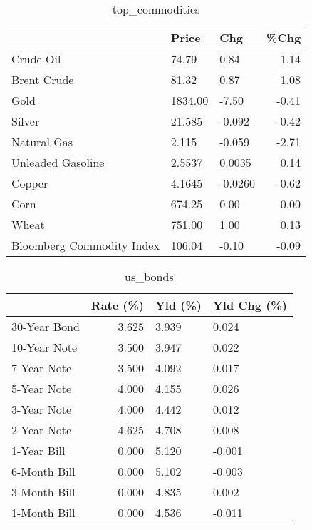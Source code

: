 \documentclass{article}%
\begin{document}
\begin{table}[htbp]%
\caption{top\_commodities}%
\centering%
\begin{adjustbox}{width=1\textwidth}%
\begin{tabular}{lllr}
\toprule
                          &   Price &     Chg &  \%Chg \\
\midrule
               Crude Oil  &   74.79 &    0.84 &  1.14 \\
             Brent Crude  &   81.32 &    0.87 &  1.08 \\
                    Gold  & 1834.00 &   -7.50 & -0.41 \\
                  Silver  &  21.585 &  -0.092 & -0.42 \\
             Natural Gas  &   2.115 &  -0.059 & -2.71 \\
       Unleaded Gasoline  &  2.5537 &  0.0035 &  0.14 \\
                  Copper  &  4.1645 & -0.0260 & -0.62 \\
                    Corn  &  674.25 &    0.00 &  0.00 \\
                   Wheat  &  751.00 &    1.00 &  0.13 \\
Bloomberg Commodity Index &  106.04 &   -0.10 & -0.09 \\
\bottomrule
\end{tabular}
%
\end{adjustbox}%
\end{table}

%


\begin{table}[htbp]%
\caption{us\_bonds}%
\centering%
\begin{adjustbox}{width=1\textwidth}%
\begin{tabular}{lrll}
\toprule
             &  Rate (\%) & Yld (\%) & Yld Chg (\%) \\
\midrule
30-Year Bond &     3.625 &   3.939 &       0.024 \\
10-Year Note &     3.500 &   3.947 &       0.022 \\
 7-Year Note &     3.500 &   4.092 &       0.017 \\
 5-Year Note &     4.000 &   4.155 &       0.026 \\
 3-Year Note &     4.000 &   4.442 &       0.012 \\
 2-Year Note &     4.625 &   4.708 &       0.008 \\
 1-Year Bill &     0.000 &   5.120 &      -0.001 \\
6-Month Bill &     0.000 &   5.102 &      -0.003 \\
3-Month Bill &     0.000 &   4.835 &       0.002 \\
1-Month Bill &     0.000 &   4.536 &      -0.011 \\
\bottomrule
\end{tabular}
%
\end{adjustbox}%
\end{table}
\end{document}
